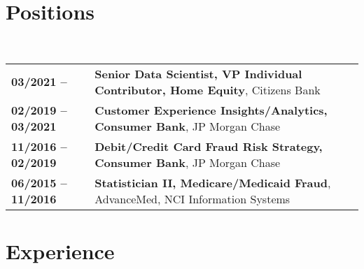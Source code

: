 \documentclass[a4paper,11pt]{article}
\begin{document}
\maketitle

\section{Positions}

~\begin{tabular}{lP{15cm}}
\textbf{03/2021 --}& \textbf{Senior Data Scientist, VP Individual Contributor, Home Equity},
        Citizens Bank\\
\textbf{02/2019 -- 03/2021}& \textbf{Customer Experience Insights/Analytics, Consumer Bank},
        JP Morgan Chase\\
\textbf{11/2016 -- 02/2019}& \textbf{Debit/Credit Card Fraud Risk Strategy, Consumer Bank},
        JP Morgan Chase\\
\textbf{06/2015 -- 11/2016}& \textbf{Statistician II, Medicare/Medicaid Fraud}, 
        AdvanceMed, NCI Information Systems \\
  \end{tabular}

\section{Experience}
\end{document}
